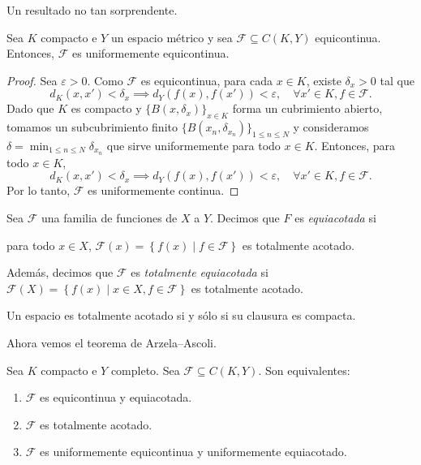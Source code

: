 Un resultado no tan sorprendente.

\begin{proposition}
	Sea $K$ compacto e $Y$ un espacio métrico y sea $\mathcal{F} \subseteq C(K, Y)$ equicontinua. Entonces, $\mathcal{F}$ es uniformemente equicontinua.
\end{proposition}

\begin{proof}
	Sea $\varepsilon > 0$. Como $\mathcal{F}$ es equicontinua, para cada $x \in K$, existe $\delta_x > 0$ tal que
	\begin{equation*}
		d_K(x, x') < \delta_x \implies d_Y(f(x), f(x')) < \varepsilon, \quad \forall x' \in K, f \in \mathcal{F}.
	\end{equation*}
	Dado que $K$ es compacto y $\{B(x, \delta_x)\}_{x \in K}$ forma un cubrimiento abierto, tomamos un subcubrimiento finito $\{B(x_n, \delta_{x_n})\}_{1 \leq n \leq N}$ y consideramos $\delta = \min_{1 \leq n \leq N} \delta_{x_n}$ que sirve uniformemente para todo $x \in K$. Entonces, para todo $x \in K$,
	\begin{equation*}
		d_K(x, x') < \delta_x \implies d_Y(f(x), f(x')) < \varepsilon, \quad \forall x' \in K, f \in \mathcal{F}.
	\end{equation*}
	Por lo tanto, $\mathcal{F}$ es uniformemente continua.
\end{proof}

\begin{definition}
	Sea $\mathcal{F}$ una familia de funciones de $X$ a $Y$. Decimos que $F$ es \emph{equiacotada} si
	\begin{center}
		para todo $x \in X$, $\mathcal{F}(x) = \left\{ f(x) \mid f \in \mathcal{F} \right\}$ es totalmente acotado.
	\end{center}
	Además, decimos que $\mathcal{F}$ es \emph{totalmente equiacotada} si $\mathcal{F}(X) = \left\{ f(x) \mid x \in X, f \in \mathcal{F} \right\}$ es totalmente acotado.
\end{definition}

\begin{remark}
	Un espacio es totalmente acotado si y sólo si su clausura es compacta.
\end{remark}

Ahora vemos el teorema de Arzela--Ascoli.

\begin{theorem}
	Sea $K$ compacto e $Y$ completo. Sea $\mathcal{F} \subseteq C(K, Y)$. Son equivalentes:
	\begin{enumerate}
		\item $\mathcal{F}$ es equicontinua y equiacotada.
		\item $\mathcal{F}$ es totalmente acotado.
		\item $\mathcal{F}$ es uniformemente equicontinua y uniformemente equiacotado.
	\end{enumerate}
\end{theorem}

